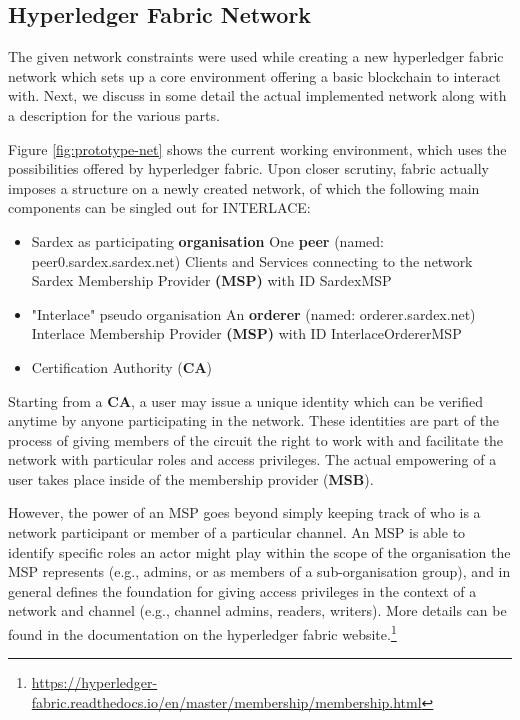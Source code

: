 \subsection{Hyperledger Fabric Network}

The given network constraints were used while creating a new hyperledger fabric network which sets up a core environment offering a basic blockchain to interact with. Next, we discuss in some detail the actual implemented network along with a description for the various parts.

Figure \ref{fig:prototype-net} shows the current working environment, which uses the possibilities offered by hyperledger fabric. Upon closer scrutiny, fabric actually imposes a structure on a newly created network, of which the following main components can be singled out for INTERLACE:

\begin{itemize}
	\item Sardex as participating \textbf{organisation}
		\subitem One  \textbf{peer} (named: peer0.sardex.sardex.net)
		\subitem Clients and Services connecting to the network
		\subitem Sardex Membership Provider \textbf{(MSP)} with ID SardexMSP
	\item "Interlace" pseudo organisation
		\subitem An \textbf{orderer} (named: orderer.sardex.net)
		\subitem Interlace Membership Provider \textbf{(MSP)} with ID InterlaceOrdererMSP
	\item Certification Authority (\textbf{CA})
\end{itemize}

Starting from a \textbf{CA}, a user may issue a unique identity which can be verified anytime by anyone participating in the network. These identities are part of the process of giving members of the circuit the right to work with and facilitate the network with particular roles and access privileges. The actual empowering of a user takes place inside of the membership provider (\textbf{MSB}).

However, the power of an MSP goes beyond simply keeping track of who is a network participant or member of a particular channel. An MSP is able to identify specific roles an actor might play  within the scope of the organisation the MSP represents (e.g., admins, or as members of a sub-organisation group), and in general defines the foundation for giving access privileges in the context of a network and channel (e.g., channel admins, readers, writers). More details can be found in the documentation on the hyperledger fabric website.\footnote{\url{https://hyperledger-fabric.readthedocs.io/en/master/membership/membership.html}}

